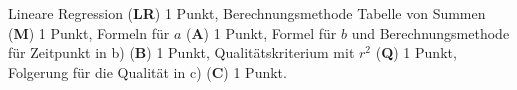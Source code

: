 \begin{bewertung}
Lineare Regression ({\bf LR}) 1 Punkt,
Berechnungsmethode Tabelle von Summen ({\bf M}) 1 Punkt,
Formeln für $a$ ({\bf A}) 1 Punkt,
Formel für $b$ und Berechnungsmethode für Zeitpunkt in b)  ({\bf B}) 1 Punkt,
Qualitätskriterium mit $r^2$ ({\bf Q}) 1 Punkt,
Folgerung für die Qualität in c) ({\bf C}) 1 Punkt.
\end{bewertung}

